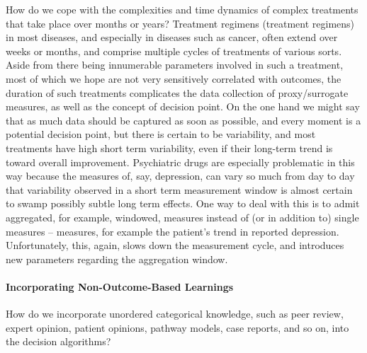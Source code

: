 \documentclass[12pt]{article}
\begin{document}
How do we cope with the complexities and time dynamics of complex
treatments that take place over months or years?  Treatment regimens
(treatment regimens) in most diseases, and especially in diseases such as cancer,
often extend over weeks or months, and comprise multiple cycles of
treatments of various sorts.  Aside from there being innumerable
parameters involved in such a treatment, most of which we hope are not
very sensitively correlated with outcomes, the duration of such
treatments complicates the data collection of proxy/surrogate
measures, as well as the concept of decision point. On the one hand we
might say that as much data should be captured as soon as possible,
and every moment is a potential decision point, but there is certain
to be variability, and most treatments have high short term
variability, even if their long-term trend is toward overall
improvement. Psychiatric drugs are especially problematic in this way
because the measures of, say, depression, can vary so much from day to
day that variability observed in a short term measurement window is
almost certain to swamp possibly subtle long term effects.  One way to
deal with this is to admit aggregated, for example, windowed, measures
instead of (or in addition to) single measures – measures, for example
the patient’s trend in reported depression. Unfortunately, this,
again, slows down the measurement cycle, and introduces new parameters
regarding the aggregation window.

\paragraph*{Incorporating Non-Outcome-Based Learnings}

How do we incorporate unordered categorical knowledge, such as peer
review, expert opinion, patient opinions, pathway models, case
reports, and so on, into the decision algorithms?
\end{document}
